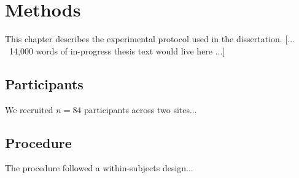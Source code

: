\chapter{Methods}
\label{ch:methods}

This chapter describes the experimental protocol used in the dissertation.
[... ~14,000 words of in-progress thesis text would live here ...]

\section{Participants}
We recruited $n=84$ participants across two sites...

\section{Procedure}
The procedure followed a within-subjects design...


